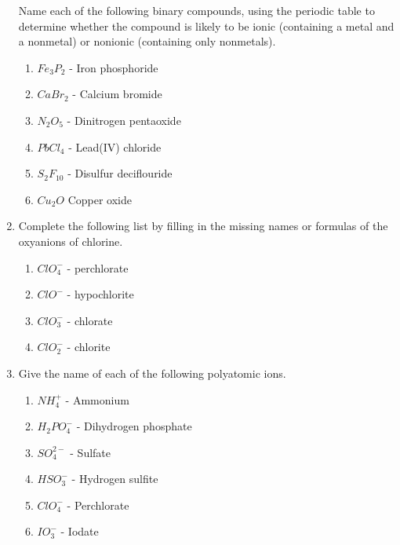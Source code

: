 \documentclass[12pt,letterpaper]{article}
\begin{document}
\begin{enumerate}
Name each of the following binary compounds, using the periodic table to determine whether the compound is likely to be ionic (containing a metal and a nonmetal) or nonionic (containing only nonmetals).

\begin{enumerate}
\item $Fe_3P_2$ - Iron phosphoride\\
\item $CaBr_2$ - Calcium bromide\\
\item $N_2O_5$ - Dinitrogen pentaoxide\\
\item $PbCl_4$ - Lead(IV) chloride\\
\item $S_2F_{10}$ - Disulfur deciflouride\\
\item $Cu_2O$ Copper oxide\\
\end{enumerate}

\setcounter{enumi}{26} %
\item 

Complete the following list by filling in the missing names or formulas of the oxyanions of chlorine.

\begin{enumerate}
\item $ClO_4^-$ -  perchlorate\\
\item $ClO^-$ - hypochlorite \\
\item $ClO_3^-$ -  chlorate \\
\item $ClO_2^-$ - chlorite \\
\end{enumerate}

\setcounter{enumi}{33} %
\item 

Give the name of each of the following polyatomic ions.

\begin{enumerate}
\item $NH_4^+$ - Ammonium\\
\item $H_2PO_4^-$ - Dihydrogen phosphate\\
\item $SO_4^{2-}$ - Sulfate\\
\item $HSO_3^-$ - Hydrogen sulfite\\
\item $ClO_4^-$ - Perchlorate\\
\item $IO_3^-$ - Iodate\\
\end{enumerate}


\end{enumerate}
\end{document}
